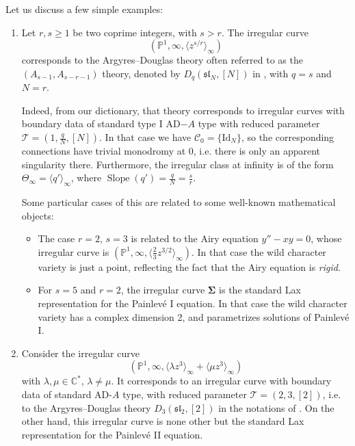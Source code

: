 \documentclass[11pt,a4paper]{amsart}
\numberwithin{equation}{section}
\DeclareMathOperator{\Slope}{Slope}
\newcommand{\cir}[1]{\langle #1 \rangle}
\begin{document}
\begin{example} Let us discuss a few simple examples:

\begin{enumerate}


\item Let $r, s\geq 1$ be two coprime integers, with $s>r$. The irregular curve 
\[
(\mathbb P^1, \infty, \cir{z^{s/r}}_\infty)
\]
corresponds to the Argyres--Douglas theory often referred to as the $(A_{s-1}, A_{s-r-1})$ theory, denoted by $D_q(\mathfrak{sl}_N, [N])$ in \cite{beem2025simplifying}, with $q=s$ and $N=r$. 

Indeed, from our dictionary, that theory corresponds to irregular curves with boundary data of standard type I AD$-A$ type with reduced parameter $\mathscr T=(1, \frac{q}{N}, [N])$. In that case we have $\mathcal C_0=\{\mathrm{Id}_N\}$, so the corresponding connections have trivial monodromy at 0, i.e. there is only an apparent singularity there. Furthermore, the irregular class at infinity is of the form $\Theta_\infty=\cir{q'}_\infty$, where $\Slope(q')=\frac{q}{N}=\frac{s}{r}$.

Some particular cases of this are related to some well-known mathematical objects:
\begin{itemize}
\item The case $r=2$, $s=3$ is related to the Airy equation $y''-xy=0$, whose irregular curve is $(\mathbb P^1, \infty, \cir{\frac{2}{3} z^{3/2}}_\infty)$. In that case the wild character variety is just a point, reflecting the fact that the Airy equation is \emph{rigid}.
 
\item For $s=5$ and $r=2$, the irregular curve $\bm\Sigma$ is the standard Lax representation for the Painlevé I equation. In that case the wild character variety has a complex dimension 2, and parametrizes solutions of Painlevé I. 
 \end{itemize}
 \item Consider the irregular curve \[
(\mathbb P^1, \infty, \cir{\lambda z^3}_\infty+\cir{\mu z^3}_\infty)
\]
with $\lambda, \mu\in \mathbb C^*$, $\lambda\neq \mu$. It corresponds to an irregular curve with boundary data of standard AD-$A$ type, with reduced parameter $\mathscr T=(2, 3, [2])$, i.e. to the Argyres--Douglas theory $D_3(\mathfrak{sl}_2, [2])$ in the notations of \cite{beem2025simplifying}. On the other hand, this irregular curve is none other but the standard Lax representation for the Painlevé II equation. 
\end{enumerate}
\end{example}
\end{document}
